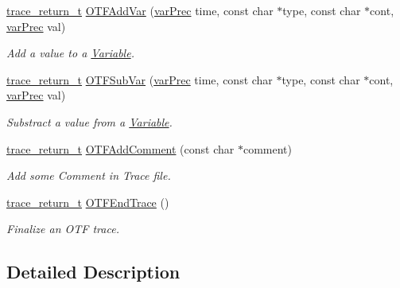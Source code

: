 \begin{DoxyCompactItemize}
\hyperlink{group__type_ga1f1b68fb37d7331f03a48ef0993a0788}{trace\-\_\-return\-\_\-t} \hyperlink{group__cotf_gac288ab52595162f8b855b95eb3a6511d}{O\-T\-F\-Add\-Var} (\hyperlink{group__type_gabda13d5bcd0cbdb094d655181a857e25}{var\-Prec} time, const char $\ast$type, const char $\ast$cont, \hyperlink{group__type_gabda13d5bcd0cbdb094d655181a857e25}{var\-Prec} val)
\begin{DoxyCompactList}\small\item\em Add a value to a \hyperlink{structVariable}{Variable}. \end{DoxyCompactList}\item 
\hyperlink{group__type_ga1f1b68fb37d7331f03a48ef0993a0788}{trace\-\_\-return\-\_\-t} \hyperlink{group__cotf_ga372542376c4963ad7c3223524a365805}{O\-T\-F\-Sub\-Var} (\hyperlink{group__type_gabda13d5bcd0cbdb094d655181a857e25}{var\-Prec} time, const char $\ast$type, const char $\ast$cont, \hyperlink{group__type_gabda13d5bcd0cbdb094d655181a857e25}{var\-Prec} val)
\begin{DoxyCompactList}\small\item\em Substract a value from a \hyperlink{structVariable}{Variable}. \end{DoxyCompactList}\item 
\hyperlink{group__type_ga1f1b68fb37d7331f03a48ef0993a0788}{trace\-\_\-return\-\_\-t} \hyperlink{group__cotf_ga647e099aae188f5b818fe4c32d1d515d}{O\-T\-F\-Add\-Comment} (const char $\ast$comment)
\begin{DoxyCompactList}\small\item\em Add some Comment in Trace file. \end{DoxyCompactList}\item 
\hyperlink{group__type_ga1f1b68fb37d7331f03a48ef0993a0788}{trace\-\_\-return\-\_\-t} \hyperlink{group__cotf_ga702d5cd834f6a960a57f4575a0e1954d}{O\-T\-F\-End\-Trace} ()
\begin{DoxyCompactList}\small\item\em Finalize an O\-T\-F trace. \end{DoxyCompactList}\end{DoxyCompactItemize}


\subsection{Detailed Description}


